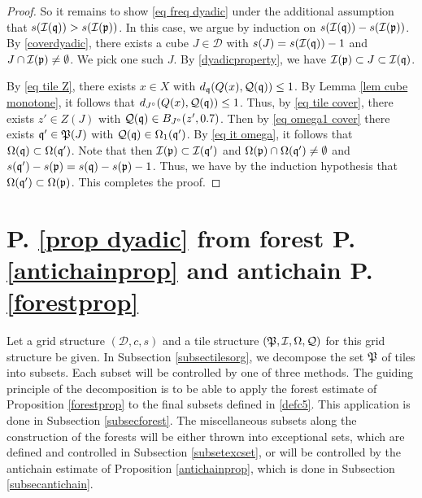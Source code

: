 \begin{proof}
    So it remains to show \eqref{eq freq dyadic} under the additional assumption that $s(\mathcal{I}(\mathfrak q)) > s(\mathcal{I}(\mathfrak p))$. In this case, we argue by induction on $s(\mathcal{I}(\mathfrak q))-s(\mathcal{I}(\mathfrak p))$. By \eqref{coverdyadic}, there exists a cube $J \in \mathcal{D}$ with $s(J) = s(\mathcal{I}(\mathfrak q)) - 1$ and $J \cap\mathcal{I}(\mathfrak p) \ne \emptyset$. We pick one such $J$. By \eqref{dyadicproperty}, we have $\mathcal{I}(\mathfrak p) \subset J \subset \mathcal{I}(\mathfrak q)$.

    By \eqref{eq tile Z}, there exists $x \in X$ with $d_{\mathfrak q}(Q(x), \mathcal{Q}(\mathfrak q)) \le 1$. By Lemma \ref{lem cube monotone}, it follows that $d_{J^\circ}(Q(x), \mathcal{Q}(\mathfrak q)) \le 1$.
    Thus, by \eqref{eq tile cover}, there exists $z' \in Z(J)$ with $\mathcal{Q}(\mathfrak q) \in B_{J^\circ}(z', 0.7)$. Then by \eqref{eq omega1 cover} there exists $\mathfrak q' \in \mathfrak P(J)$ with $\mathcal{Q}(\mathfrak q) \in\Omega_1(\mathfrak q')$.
    By \eqref{eq it omega}, it follows that $\Omega(\mathfrak q) \subset \Omega(\mathfrak q')$. Note that then $\mathcal{I}(\mathfrak p) \subset \mathcal{I}(\mathfrak q')$ and $\Omega(\mathfrak p) \cap \Omega(\mathfrak q') \ne \emptyset$ and $s(\mathfrak q') - s(\mathfrak p) = s(\mathfrak q) - s(\mathfrak p) - 1$. Thus, we have by the induction hypothesis that $\Omega(\mathfrak q') \subset \Omega(\mathfrak p)$. This completes the proof.
\end{proof}

\chapter{P. \ref{prop dyadic} from forest P. \ref{antichainprop} and antichain P. \ref{forestprop}}
\label{proptopropprop}



Let a grid structure $(\mathcal{D}, c, s)$  and a tile structure $(\mathfrak P,\mathcal{I},\Omega,\mathcal{Q})$
for this grid structure be given.
In Subsection \ref{subsectilesorg}, we decompose the
set $\mathfrak P$ of tiles into subsets.
Each subset will be controlled by one of three methods.
The guiding principle of the decomposition is
to be able to apply the forest estimate
of Proposition \ref{forestprop} to the final subsets
defined in \eqref{defc5}. This application is done in Subsection \ref{subsecforest}.
The miscellaneous subsets along the construction of the
forests will be either thrown into exceptional sets,
which are defined and controlled in Subsection
\ref{subsetexcset}, or will be controlled by
the antichain estimate of Proposition \ref{antichainprop},
which is done in Subsection \ref{subsecantichain}.




